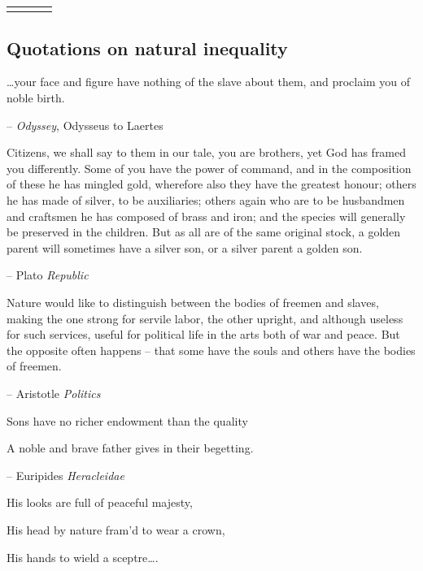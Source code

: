 \documentclass[
]{article}
\theoremstyle{definition}
\theoremstyle{definition}
\theoremstyle{definition}
\theoremstyle{definition}
\theoremstyle{remark}
\begin{document}
\begin{table}[ht]
\begin{centerbox}
\begin{threeparttable}
\begin{tabularx}{0.8\textwidth}{p{} p{} p{} p{}}
\hhline{}
\arrayrulecolor{black}
\end{tabularx}
\end{threeparttable}\par\end{centerbox}

\end{table}
 

\FloatBarrier

\clearpage

\hypertarget{quotations-on-natural-inequality}{%
\subsection{Quotations on natural inequality}\label{quotations-on-natural-inequality}}

\ldots your face and figure have nothing of the slave about them, and
proclaim you of noble birth.

-- \emph{Odyssey}, Odysseus to Laertes

Citizens, we shall say to them in our tale, you are brothers, yet God
has framed you differently. Some of you have the power of command, and
in the composition of these he has mingled gold, wherefore also they
have the greatest honour; others he has made of silver, to be
auxiliaries; others again who are to be husbandmen and craftsmen he has
composed of brass and iron; and the species will generally be preserved
in the children. But as all are of the same original stock, a golden
parent will sometimes have a silver son, or a silver parent a golden
son.

-- Plato \emph{Republic}

Nature would like to distinguish between the bodies of freemen and
slaves, making the one strong for servile labor, the other upright, and
although useless for such services, useful for political life in the
arts both of war and peace. But the opposite often happens -- that some
have the souls and others have the bodies of freemen.

-- Aristotle \emph{Politics}

Sons have no richer endowment than the quality

A noble and brave father gives in their begetting.

-- Euripides \emph{Heracleidae}

His looks are full of peaceful majesty,

His head by nature fram'd to wear a crown,

His hands to wield a sceptre\ldots.
\end{document}
